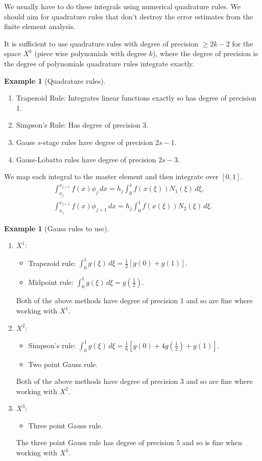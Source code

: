 \documentclass[12pt, a4paper]{article}
\theoremstyle{definition}
\newtheorem{example}[thm]{Example}
\theoremstyle{remark}
\numberwithin{equation}{section}
\begin{document}
We usually have  to do these integrals using numerical quadrature rules. We should aim for quadrature rules that don't destroy the error estimates from the finite element analysis.

It is sufficient to use quadrature rules with degree of precision $\ge 2k-2$ for the space $X^k$ (piece wise polynomials with degree $k$), where the degree of precision is the degree of polynomials quadrature rules integrate exactly.

\begin{example}[Quadrature rules] \ \\
\begin{enumerate}
\item Trapezoid Rule: Integrates linear functions exactly so has degree of precision 1.
\item Simpson's Rule: Has degree of precision 3.
\item Gauss $s$-stage rules have degree of precision $2s-1$.
\item Gauss-Lobatto rules have degree of precision $2s-3$.
\end{enumerate}
\end{example}

We map each integral to the master element and then integrate over $[0,1]$.
\begin{align*}
\int_{x_j}^{x_{j+1}}f(x)\phi_{j} \, dx=h_j \int_0^1 f(x(\xi))N_1(\xi) \,d\xi, \\
\int_{x_j}^{x_{j+1}}f(x)\phi_{j+1} \, dx=h_j \int_0^1 f(x(\xi))N_2(\xi) \,d\xi.
\end{align*}

\begin{example}[Gauss rules to use] \ \\
\begin{enumerate}
\item $X^1$:
\begin{itemize}
\item Trapezoid rule: $\int_0^1 g(\xi) \, d\xi = \frac{1}{2}[g(0)+g(1)].$
\item Midpoint rule: $\int_0^1 g(\xi)\,d\xi=g(\frac{1}{2}).$
\end{itemize}
Both of the above methods have degree of precision 1 and so are fine where working with $X^1$.

\item $X^2$:
\begin{itemize}
\item Simpson's rule: $\int_0^1 g(\xi) \, d\xi = \frac{1}{6}[g(0)+4g(\frac{1}{2})+g(1)].$
\item Two point Gauss rule.
\end{itemize}
Both of the above methods have degree of precision 3 and so are fine where working with $X^2$.

\item $X^3$:
\begin{itemize}
\item Three point Gauss rule.
\end{itemize}
The three point Gauss rule has degree of precision 5 and so is fine when working with $X^3$.
\end{enumerate}
\end{example}
\end{document}
